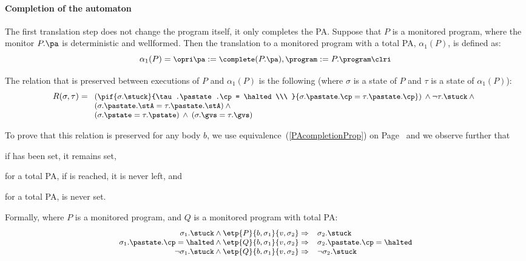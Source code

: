 \paragraph{Completion of the automaton}
The first translation step does not change the program itself, it only
completes the PA. Suppose that \(P\) is a monitored program, where the
monitor \(P.\pa\) is deterministic and wellformed. Then the
translation to a monitored program with a total PA, \(\alpha_1(P)\),
is defined as:
\[{\small
\alpha_1(P) = \opri \pa := \complete(P.\pa), \program := P.\program
\clri
}
\]

The relation that is preserved between executions of \(P\) and
\(\alpha_1(P)\) is the following (where \(\sigma\) is a state of
\(P\) and \(\tau\) is a state of \(\alpha_1(P)\)):
\[{\small
R(\sigma, \tau) =\\
 \begin{array}[t]{l}
  (\pif {\sigma.\stuck}{\tau.\pastate.\cp = \halted\\\ }
        {\sigma.\pastate.\cp = \tau.\pastate.\cp}) \:\wedge
  \neg \tau.\stuck \:\wedge\\
  (\sigma.\pastate.\stA = \tau.\pastate.\stA) \:\wedge\\
  (\sigma.\pstate = \tau.\pstate) \:\wedge\: (\sigma.\gvs = \tau.\gvs)
\end{array}}
\]

To prove that this relation is preserved for any body \(b\), we
use equivalence~(\ref{PAcompletionProp}) on
Page~\pageref{PAcompletionProp} and we observe further that
\begin{inparaenum}
\item if \stuck has been set, it remains set,
\item for a total PA, if  \halted is reached, it is never left, and
\item for a total PA, \stuck is never set.
\end{inparaenum} Formally, where \(P\) is a monitored program, and
\(Q\) is a monitored program with total PA:
\[{\small
\begin{array}[t]{rl}
\sigma_1.\stuck \wedge \etp{P}{b,\sigma_1}{v,\sigma_2} \Rightarrow &
\sigma_2.\stuck \\
\sigma_1.\pastate.\cp = \halted \wedge
\etp{Q}{b,\sigma_1}{v,\sigma_2} \Rightarrow &
\sigma_2.\pastate.\cp = \halted \\
\neg \sigma_1.\stuck \wedge \etp{Q}{b,\sigma_1}{v,\sigma_2} \Rightarrow &
\neg \sigma_2.\stuck
\end{array}}
\]

